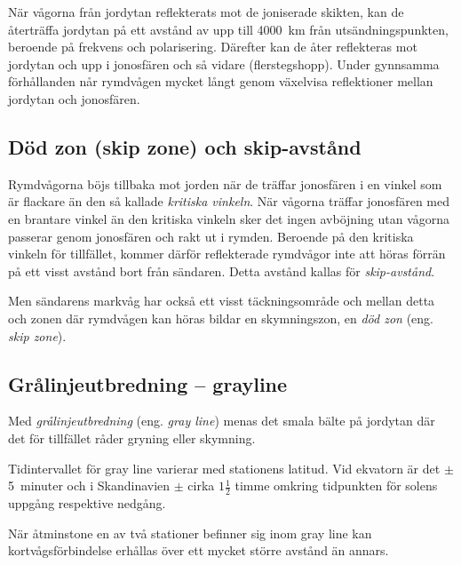 
När vågorna från jordytan reflekterats mot de joniserade skikten, kan
de återträffa jordytan på ett avstånd av upp till \qty{4000}{\kilo\metre} från
utsändningspunkten, beroende på frekvens och polarisering.
Därefter kan de åter reflekteras mot jordytan och upp i jonosfären
och så vidare (flerstegshopp).
Under gynnsamma förhållanden når rymdvågen mycket långt genom växelvisa
reflektioner mellan jordytan och jonosfären.

\subsection{Död zon (skip zone) och skip-avstånd}

Rymdvågorna böjs tillbaka mot jorden när de träffar jonosfären i en
vinkel som är flackare än den så kallade \emph{kritiska vinkeln}.
När vågorna träffar jonosfären med en brantare vinkel än den kritiska vinkeln
sker det ingen avböjning utan vågorna passerar genom jonosfären och rakt ut
i rymden.
Beroende på den kritiska vinkeln för tillfället, kommer därför reflekterade
rymdvågor inte att höras förrän på ett visst avstånd bort från sändaren.
Detta avstånd kallas för \emph{skip-avstånd}.

Men sändarens markvåg har också ett visst täckningsområde och mellan
detta och zonen där rymdvågen kan höras bildar en skymningszon, en
\emph{död zon} (eng. \emph{skip zone}).

\subsection{Grålinjeutbredning -- grayline}

Med \emph{grålinjeutbredning} (eng. \emph{gray line}) menas det smala bälte på
jordytan där det för tillfället råder gryning eller skymning.

Tidintervallet för gray line varierar med stationens latitud.
Vid ekvatorn är det \(\pm\) 5~minuter och i Skandinavien \(\pm\) cirka
\(1\frac{1}{2}\) timme omkring tidpunkten för solens uppgång
respektive nedgång.

När åtminstone en av två stationer befinner sig inom gray line kan
kortvågsförbindelse erhållas över ett mycket större avstånd än annars.


